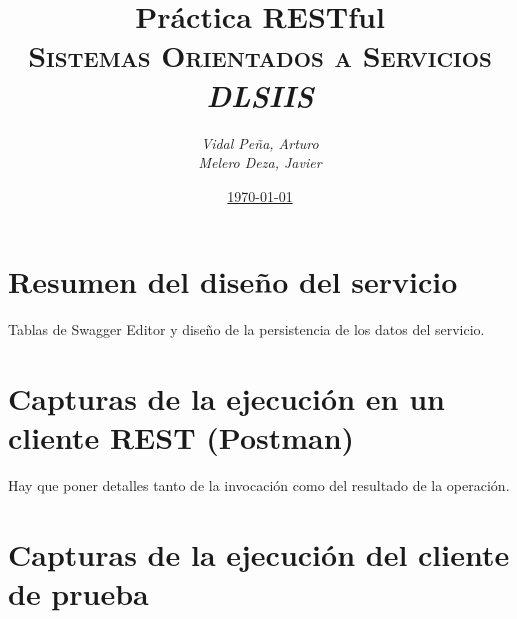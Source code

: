 \documentclass[12pt,a4paper, spanish]{article}
\title{\textbf{Práctica RESTful} \\
       \textsc{Sistemas Orientados a Servicios} \\
       \emph{DLSIIS}}
\author{\emph{Vidal Peña, Arturo}\\
        \emph{Melero Deza, Javier}}
\date{\underline{\today}}
\begin{document}
\maketitle
\thispagestyle{empty}
\renewcommand*\contentsname{Index of contents}
\tableofcontents
\pagebreak


\section{Resumen del diseño del servicio}
Tablas de Swagger Editor y diseño de la persistencia de los datos del servicio.

\newpage
\section{Capturas de la ejecución en un cliente REST (Postman)}
Hay que poner detalles tanto de la invocación como del resultado de la operación.

\newpage
\section{Capturas de la ejecución del cliente de prueba}
\end{document}

